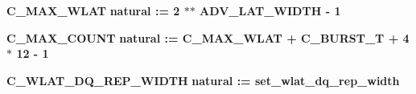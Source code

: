 \begin{DoxyCompactItemize}
\item 
{\bf C\+\_\+\+M\+A\+X\+\_\+\+W\+L\+AT} {\bfseries \textcolor{comment}{natural}\textcolor{vhdlchar}{ }\textcolor{vhdlchar}{ }\textcolor{vhdlchar}{\+:}\textcolor{vhdlchar}{=}\textcolor{vhdlchar}{ }\textcolor{vhdlchar}{ } \textcolor{vhdldigit}{2} \textcolor{vhdlchar}{$\ast$}\textcolor{vhdlchar}{$\ast$}\textcolor{vhdlchar}{ }\textcolor{vhdlchar}{ }\textcolor{vhdlchar}{ }{\bfseries {\bf A\+D\+V\+\_\+\+L\+A\+T\+\_\+\+W\+I\+D\+TH}} \textcolor{vhdlchar}{-\/}\textcolor{vhdlchar}{ } \textcolor{vhdldigit}{1} \textcolor{vhdlchar}{ }} 
\item 
{\bf C\+\_\+\+M\+A\+X\+\_\+\+C\+O\+U\+NT} {\bfseries \textcolor{comment}{natural}\textcolor{vhdlchar}{ }\textcolor{vhdlchar}{ }\textcolor{vhdlchar}{\+:}\textcolor{vhdlchar}{=}\textcolor{vhdlchar}{ }\textcolor{vhdlchar}{ }\textcolor{vhdlchar}{ }\textcolor{vhdlchar}{ }{\bfseries {\bf C\+\_\+\+M\+A\+X\+\_\+\+W\+L\+AT}} \textcolor{vhdlchar}{+}\textcolor{vhdlchar}{ }\textcolor{vhdlchar}{ }\textcolor{vhdlchar}{ }{\bfseries {\bf C\+\_\+\+B\+U\+R\+S\+T\+\_\+T}} \textcolor{vhdlchar}{+}\textcolor{vhdlchar}{ } \textcolor{vhdldigit}{4} \textcolor{vhdlchar}{$\ast$}\textcolor{vhdlchar}{ } \textcolor{vhdldigit}{12} \textcolor{vhdlchar}{-\/}\textcolor{vhdlchar}{ } \textcolor{vhdldigit}{1} \textcolor{vhdlchar}{ }} 
\item 
{\bf C\+\_\+\+W\+L\+A\+T\+\_\+\+D\+Q\+\_\+\+R\+E\+P\+\_\+\+W\+I\+D\+TH} {\bfseries \textcolor{comment}{natural}\textcolor{vhdlchar}{ }\textcolor{vhdlchar}{ }\textcolor{vhdlchar}{\+:}\textcolor{vhdlchar}{=}\textcolor{vhdlchar}{ }\textcolor{vhdlchar}{ }\textcolor{vhdlchar}{ }\textcolor{vhdlchar}{ }\textcolor{vhdlchar}{set\+\_\+wlat\+\_\+dq\+\_\+rep\+\_\+width}\textcolor{vhdlchar}{ }} 
\end{DoxyCompactItemize}

